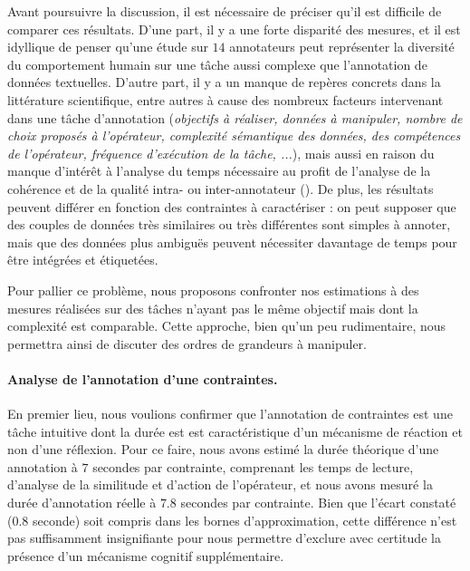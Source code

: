 		\begin{leftBarAuthorOpinion}
			Avant poursuivre la discussion, il est nécessaire de préciser qu'il est difficile de comparer ces résultats.
			D'une part, il y a une forte disparité des mesures, et il est idyllique de penser qu'une étude sur $14$ annotateurs peut représenter la diversité du comportement humain sur une tâche aussi complexe que l'annotation de données textuelles.
			D'autre part, il y a un manque de repères concrets dans la littérature scientifique, entre autres à cause des nombreux facteurs intervenant dans une tâche d'annotation (\textit{objectifs à réaliser, données à manipuler, nombre de choix proposés à l'opérateur, complexité sémantique des données, des compétences de l'opérateur, fréquence d'exécution de la tâche, ...}), mais aussi en raison du manque d'intérêt à l'analyse du temps nécessaire au profit de l'analyse de la cohérence et de la qualité intra- ou inter-annotateur (\cite{baledent:2022:complexite-annotation-manuelle}).
			De plus, les résultats peuvent différer en fonction des contraintes à caractériser : on peut supposer que des couples de données très similaires ou très différentes sont simples à annoter, mais que des données plus ambiguës peuvent nécessiter davantage de temps pour être intégrées et étiquetées.
			
			Pour pallier ce problème, nous proposons confronter nos estimations à des mesures réalisées sur des tâches n'ayant pas le même objectif mais dont la complexité est comparable.
			Cette approche, bien qu'un peu rudimentaire, nous permettra ainsi de discuter des ordres de grandeurs à manipuler.
		\end{leftBarAuthorOpinion}
		
		
		\paragraph{Analyse de l'annotation d'une contraintes.}
		
			En premier lieu, nous voulions confirmer que l'annotation de contraintes est une tâche intuitive dont la durée est est caractéristique d'un mécanisme de réaction et non d'une réflexion.
			Pour ce faire, nous avons estimé la durée théorique d'une annotation à $7$ secondes par contrainte, comprenant les temps de lecture, d'analyse de la similitude et d'action de l'opérateur, et nous avons mesuré la durée d'annotation réelle à $7.8$ secondes par contrainte.
			Bien que l'écart constaté ($0.8$ seconde) soit compris dans les bornes d'approximation, cette différence n'est pas suffisamment insignifiante pour nous permettre d'exclure avec certitude la présence d'un mécanisme cognitif supplémentaire.
				
